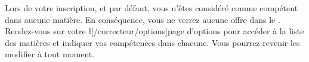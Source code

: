 ﻿Lors de votre inscription, et par défaut, vous n'êtes considéré comme compétent dans aucune matière. En conséquence, vous ne verrez aucune offre dans le . Rendez-vous sur votre \l[/correcteur/options]{page d'options} pour accéder à la liste des matières et indiquer vos compétences dans chacune. Vous pourrez revenir les modifier à tout moment.